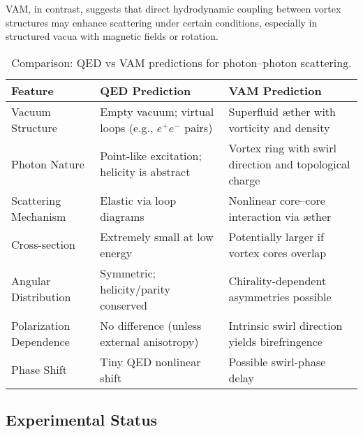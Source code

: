                 VAM, in contrast, suggests that direct hydrodynamic coupling between vortex structures may enhance scattering under certain conditions, especially in structured vacua with magnetic fields or rotation.

                \begin{table}[h!]
                    \centering
                    \caption{Comparison: QED vs VAM predictions for photon–photon scattering.}
                    \begin{tabular}{|p{4.2cm}|p{5cm}|p{5cm}|}
                        \hline
                        \textbf{Feature} & \textbf{QED Prediction} & \textbf{VAM Prediction} \\
                        \hline
                        Vacuum Structure & Empty vacuum; virtual loops (e.g., $e^+e^-$ pairs) & Superfluid æther with vorticity and density \\
                        \hline
                        Photon Nature & Point-like excitation; helicity is abstract & Vortex ring with swirl direction and topological charge \\
                        \hline
                        Scattering Mechanism & Elastic via loop diagrams & Nonlinear core–core interaction via æther \\
                        \hline
                        Cross-section & Extremely small at low energy & Potentially larger if vortex cores overlap \\
                        \hline
                        Angular Distribution & Symmetric; helicity/parity conserved & Chirality-dependent asymmetries possible \\
                        \hline
                        Polarization Dependence & No difference (unless external anisotropy) & Intrinsic swirl direction yields birefringence \\
                        \hline
                        Phase Shift & Tiny QED nonlinear shift & Possible swirl-phase delay \\
                        \hline
                    \end{tabular}
                    \label{tab:qed-vam}
                \end{table}

        \subsection{Experimental Status}

